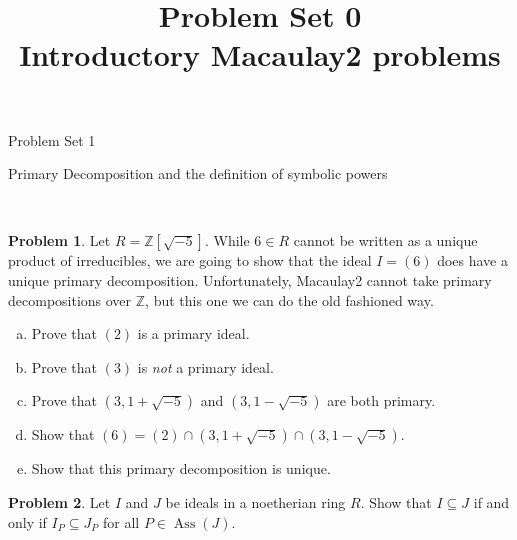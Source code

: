 \documentclass[11pt]{article}
\title{}
\date{\vspace{-0.5in}}
\title{Problem Set 0 \\ Introductory Macaulay2 problems}
\DeclareMathOperator{\Ass}{Ass}
\theoremstyle{definition}
\newtheorem{problem}{Problem}
\begin{document}
\thispagestyle{fancy}
\pagestyle{fancy}


\begin{center}
	{\LARGE Problem Set 1\\
	
	\vspace{0.5em}
	
	Primary Decomposition and the definition of symbolic powers}
\end{center}

\

\begin{problem}
	Let $R = \mathbb{Z}[\sqrt{-5}]$. While $6 \in R$ cannot be written as a unique product of irreducibles, we are going to show that the ideal $I = (6)$ does have a unique primary decomposition. Unfortunately, Macaulay2 cannot take primary decompositions over $\mathbb{Z}$, but this one we can do the old fashioned way.	
	\begin{enumerate}[a)]
	\item Prove that $(2)$ is a primary ideal.
	\item Prove that $(3)$ is \emph{not} a primary ideal.
	\item Prove that $(3, 1+\sqrt{-5})$ and $(3, 1-\sqrt{-5})$ are both primary.
	\item Show that $(6) = (2) \cap (3, 1+\sqrt{-5}) \cap (3, 1 -\sqrt{-5})$.
	\item Show that this primary decomposition is unique.
	\end{enumerate}
\end{problem}

\begin{problem}
	Let $I$ and $J$ be ideals in a noetherian ring $R$. Show that $I \subseteq J$ if and only if $I_P \subseteq J_P$ for all $P \in \Ass(J)$.
\end{problem}
\end{document}
